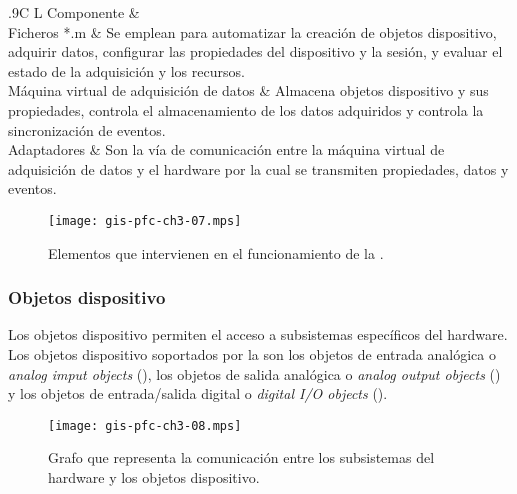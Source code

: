 \begin{table}
	\centering
	\begin{tabulary}{.9\textwidth}{C L}
		\toprule
		Componente &  \\
		\midrule
		Ficheros *.m & Se emplean para automatizar la creación de
		objetos dispositivo, adquirir datos, configurar las
		propiedades del dispositivo y la sesión, y evaluar el
		estado de la adquisición y los recursos.\\
		\midrule
		Máquina virtual de adquisición de datos & Almacena objetos
		dispositivo y sus propiedades, controla el almacenamiento
		de los datos adquiridos y controla la sincronización de
		eventos.\\
		\midrule
		Adaptadores & Son la vía de comunicación entre la máquina
		virtual de adquisición de datos y el hardware por la cual
		se transmiten propiedades, datos y eventos.\\
		\bottomrule
	\end{tabulary}
	\caption[Descripción de los componentes de la \datx{}] {Descripción
	de los componentes de la \datx{}.}
	\label{tab:toolcomp}
\end{table}

\begin{figure}
	\begin{center}
		\texttt{[image: gis-pfc-ch3-07.mps]}
	\end{center}
	\caption[Elementos que intervienen en el funcionamiento de la
	\datx{}]{Elementos que intervienen en el funcionamiento de la
	\datx{}.}
	\label{fig:toolcomp}
\end{figure}

\subsubsection{Objetos dispositivo}

Los objetos dispositivo permiten el acceso a subsistemas específicos del
hardware. Los objetos dispositivo soportados por la \datx{} son los objetos
de entrada analógica o \emph{analog imput objects} (), los objetos
de salida analógica o \emph{analog output objects} () y los
objetos de entrada/salida digital o \emph{digital I/O objects}
().

\begin{figure}
	\begin{center}
		\texttt{[image: gis-pfc-ch3-08.mps]}
	\end{center}
	\caption[Comunicación entre los subsistemas del hardware y los
	objetos dispositivo]{Grafo que representa la comunicación entre los
	subsistemas del hardware y los objetos dispositivo.}
	\label{fig:subsystemsOO}
\end{figure}


